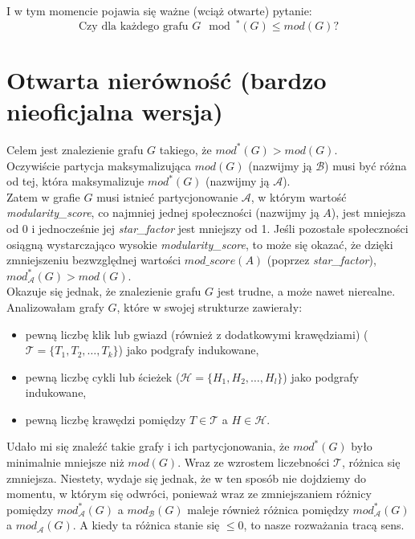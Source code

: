 \documentclass[letterpaper,12pt]{article}
\begin{document}
  I w tym momencie pojawia się ważne (wciąż otwarte) pytanie:
  \[\text{Czy dla każdego grafu $G$} \mod^*(G) \leq mod(G)?\]

\section{Otwarta nierówność (bardzo nieoficjalna wersja)}
  Celem jest znalezienie grafu \(G\) takiego, że \(mod^*(G) > mod(G)\).\\
  Oczywiście partycja maksymalizująca \(mod(G)\) (nazwijmy ją \(\mathcal{B}\)) musi być różna od tej, która maksymalizuje \(mod^*(G)\) (nazwijmy ją \(\mathcal{A}\)).\\
  Zatem w grafie \(G\) musi istnieć partycjonowanie \(\mathcal{A}\), w którym wartość \textit{modularity\_score}, co najmniej jednej społeczności (nazwijmy ją \(A\)), jest mniejsza od 0 i jednocześnie jej \textit{star\_factor} jest mniejszy od 1. Jeśli pozostałe społeczności osiągną wystarczająco wysokie \textit{modularity\_score}, to może się okazać, że dzięki zmniejszeniu bezwzględnej wartości \(mod\_score(A)\) (poprzez \textit{star\_factor}), \(mod^*_{\mathcal{A}}(G) > mod(G)\).\\

  Okazuje się jednak, że znalezienie grafu \(G\) jest trudne, a może nawet nierealne.\\


  Analizowałam grafy \(G\), które w swojej strukturze zawierały:
  \begin{itemize}
    \item pewną liczbę klik lub gwiazd (również z dodatkowymi krawędziami) (\(\mathcal{T} = \{
      T_1, T_2, \ldots, T_k\}\)) jako podgrafy indukowane,
    \item pewną liczbę cykli lub ścieżek (\(\mathcal{H} = \{H_1, H_2, \ldots, H_l\}\)) jako podgrafy indukowane,
    \item pewną liczbę krawędzi pomiędzy \(T \in \mathcal{T}\) a \(H \in \mathcal{H}\).
  \end{itemize}

  Udało mi się znaleźć takie grafy i ich partycjonowania, że \(mod^*(G)\) było minimalnie mniejsze niż \(mod(G)\). Wraz ze wzrostem liczebności \(\mathcal{T}\), różnica się zmniejsza. Niestety, wydaje się jednak, że w ten sposób nie dojdziemy do momentu, w którym się odwróci, ponieważ wraz ze zmniejszaniem różnicy pomiędzy \(mod^*_{\mathcal{A}}(G)\) a \(mod_{\mathcal{B}}(G)\) maleje również różnica pomiędzy \(mod^*_{\mathcal{A}}(G)\) a \(mod_{\mathcal{A}}(G)\). A kiedy ta różnica stanie się \(\leq 0\), to nasze rozważania tracą sens.\\
\end{document}
